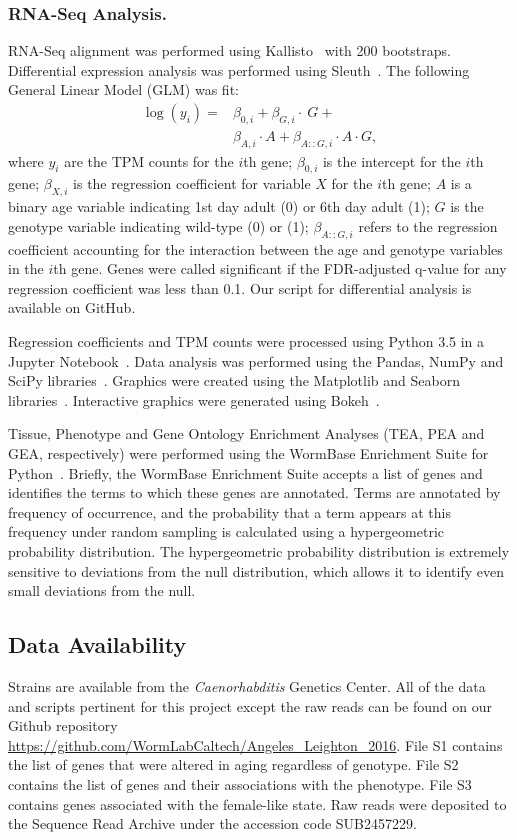 \subsubsection*{RNA-Seq Analysis.}
RNA-Seq alignment was performed using Kallisto~\citep{Bray2016} with 200
bootstraps.
Differential expression analysis was performed using Sleuth~\citep{Pimentel2016}.
The following General Linear Model (GLM) was fit:
\begin{align*}
  \log(y_i) =& \beta_{0,i} + \beta_{G,i}\cdot~G + \\
  &\beta_{A,i}\cdot A + \beta_{A::G,i}\cdot A\cdot G,
  \label{eqn:GLM}
\end{align*}
where $y_i$ are the TPM counts for the $i$th gene; $\beta_{0,i}$ is the intercept
for the $i$th gene; $\beta_{X,i}$ is the regression coefficient for variable
$X$ for the $i$th gene; $A$ is a binary age variable indicating 1st day adult
(0) or 6th day adult (1); $G$ is the genotype variable indicating wild-type
(0) or \fog{} (1); $\beta_{A::G, i}$ refers to the regression coefficient
accounting for the interaction between the age and genotype variables in the
$i$th gene. Genes were called significant if the FDR-adjusted q-value for any
regression coefficient was less than 0.1. Our script for differential analysis
is available on GitHub.

Regression coefficients and TPM counts were processed using Python 3.5 in a
Jupyter Notebook~\citep{Perez2007}. Data analysis was performed using the Pandas,
NumPy and SciPy libraries~\citep{McKinney2011,VanDerWalt2011,Oliphant2007}.
Graphics were created using the Matplotlib and Seaborn
libraries~\citep{Waskom,Hunter2007}. Interactive graphics were generated using
Bokeh~\citep{Team2014}.

Tissue, Phenotype and Gene Ontology Enrichment Analyses (TEA, PEA and GEA,
respectively) were performed using the WormBase Enrichment Suite for
Python~\citep{Angeles-Albores2016,Angeles-AlboresPEA}. Briefly, the WormBase
Enrichment Suite accepts a list of genes and identifies the terms to which these
genes are annotated. Terms are annotated by frequency of occurrence, and the
probability that a term appears at this frequency under random sampling is
calculated using a hypergeometric probability distribution. The hypergeometric
probability distribution is extremely sensitive to deviations from the null
distribution, which allows it to identify even small deviations from the null.

\subsection*{Data Availability}
\label{sb:data_availability}
Strains are available from the \emph{Caenorhabditis} Genetics Center. All of the
data and scripts pertinent for this project except the raw reads can be found on
our Github repository
\url{https://github.com/WormLabCaltech/Angeles_Leighton_2016}. File S1 contains
the list of genes that were altered in aging regardless of genotype. File S2
contains the list of genes and their associations with the \fog{} phenotype.
File S3 contains genes associated with the female-like state. Raw reads were
deposited to the Sequence Read Archive under the accession code SUB2457229.


